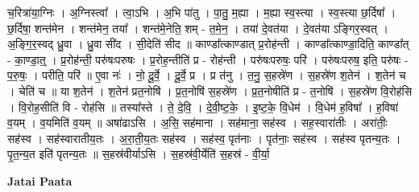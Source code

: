 \documentclass[17pt]{extarticle}
\begin{document}
च॒रित्रा॑या॒ग्निः । अ॒ग्निस्त्वा᳚ । त्वा॒ऽभि । अ॒भि पा॑तु । पा॒तु॒ म॒ह्या । म॒ह्या स्व॒स्त्या । स्व॒स्त्या छ॒र्दिषा᳚ । छ॒र्दिषा॒ शन्त॑मेन । शन्त॑मेन॒ तया᳚ । शन्त॑मे॒नेति॒ शम् - त॒मे॒न॒ । तया॑ दे॒वत॑या । दे॒वत॑या ऽङ्गिर॒स्वत् । अ॒ङ्गि॒र॒स्वद् ध्रु॒वा । ध्रु॒वा सी॑द । सी॒देति॑ सीद ॥ काण्डा᳚त्काण्डात् प्र॒रोह॑न्ती । काण्डा᳚त्काण्डा॒दिति॒ काण्डा᳚त् - का॒ण्डा॒त्॒ । प्र॒रोह॑न्ती॒ परु॑षःपरुषः । प्र॒रोह॒न्तीति॑ प्र - रोह॑न्ती । परु॑षःपरुषः॒ परि॑ । परु॑षःपरुष॒ इति॒ परु॑षः - प॒रु॒षः॒ । परीति॒ परि॑ ॥ ए॒वा नः॑ । नो॒ दू॒र्वे॒ । दू॒र्वे॒ प्र । प्र त॑नु । त॒नु॒ स॒हस्रे॑ण । स॒हस्रे॑ण श॒तेन॑ । श॒तेन॑ च । चेति॑ च ॥ या श॒तेन॑ । श॒तेन॑ प्रत॒नोषि॑ । प्र॒त॒नोषि॑ स॒हस्रे॑ण । प्र॒त॒नोषीति॑ प्र - त॒नोषि॑ । स॒हस्रे॑ण वि॒रोह॑सि । वि॒रोह॒सीति॑ वि - रोह॑सि ॥ तस्या᳚स्ते । ते॒ दे॒वि॒ । दे॒वी॒ष्ट॒के॒ । इ॒ष्ट॒के॒ वि॒धेम॑ । वि॒धेम॑ ह॒विषा᳚ । ह॒विषा॑ व॒यम् । व॒यमिति॑ व॒यम् ॥ अषा॑ढाऽसि । अ॒सि॒ सह॑माना । सह॑माना॒ सह॑स्व । सह॒स्वारा॑तीः । अरा॑तीः॒ सह॑स्व । सह॑स्वारातीय॒तः । अ॒रा॒ती॒य॒तः सह॑स्व । सह॑स्व॒ पृत॑नाः । पृत॑नाः॒ सह॑स्व । सह॑स्व पृतन्य॒तः । पृ॒त॒न्य॒त इति॑ पृतन्य॒तः ॥ स॒हस्र॑वीर्याऽसि । स॒हस्र॑वी॒र्येति॑ स॒हस्र॑ - वी॒र्या॒ \newline

\textbf{Jatai Paata} \newline
\end{document}
